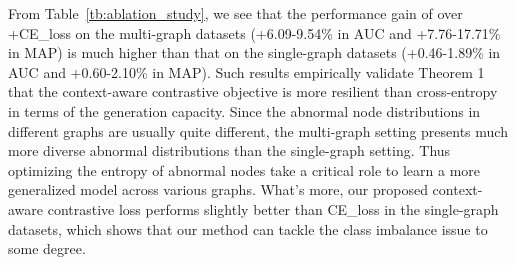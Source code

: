 From Table~\ref{tb:ablation_study}, we see that the performance gain of \smodel over +CE\_loss on the multi-graph datasets (+6.09-9.54\% in AUC and +7.76-17.71\% in MAP) is much higher than that on the single-graph datasets (+0.46-1.89\% in AUC and +0.60-2.10\% in MAP). 
Such results empirically validate Theorem 1 that the context-aware contrastive objective is more resilient than cross-entropy in terms of the generation capacity. 
Since the abnormal node distributions in different graphs are usually quite different, the multi-graph setting presents much more diverse abnormal distributions than the single-graph setting. Thus optimizing the entropy of abnormal nodes take a critical role to learn a more generalized model across various graphs. 
What's more, our proposed context-aware contrastive loss performs slightly better than CE\_loss in the single-graph datasets, which shows that our method can tackle the class imbalance issue to some degree.







